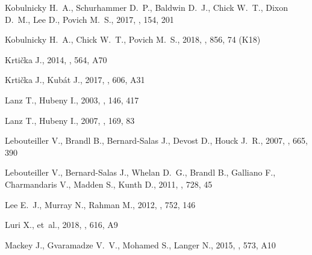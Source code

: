 \documentclass[useAMS, usenatbib, a4paper]{mnras}
\begin{document}
\begin{thebibliography}{}
{Kobulnicky} H.~A.,  {Schurhammer} D.~P.,  {Baldwin} D.~J.,  {Chick} W.~T.,
  {Dixon} D.~M.,  {Lee} D.,   {Povich} M.~S.,  2017, \aj, 154, 201

{Kobulnicky} H.~A.,  {Chick} W.~T.,   {Povich} M.~S.,  2018, \apj, 856, 74
  (K18)

{Krti{\v c}ka} J.,  2014, \aap, 564, A70

{Krtička} J.,  {Kubát} J.,  2017, \aap, 606, A31

{Lanz} T.,  {Hubeny} I.,  2003, \apjs, 146, 417

{Lanz} T.,  {Hubeny} I.,  2007, \apjs, 169, 83

{Lebouteiller} V.,  {Brandl} B.,  {Bernard-Salas} J.,  {Devost} D.,   {Houck}
  J.~R.,  2007, \apj, 665, 390

{Lebouteiller} V.,  {Bernard-Salas} J.,  {Whelan} D.~G.,  {Brandl} B.,
  {Galliano} F.,  {Charmandaris} V.,  {Madden} S.,   {Kunth} D.,  2011, \apj,
  728, 45

{Lee} E.~J.,  {Murray} N.,   {Rahman} M.,  2012, \apj, 752, 146

{Luri} X.,  et~al., 2018, \aap, 616, A9

{Mackey} J.,  {Gvaramadze} V.~V.,  {Mohamed} S.,   {Langer} N.,  2015, \aap,
  573, A10


\end{thebibliography}
\end{document}
